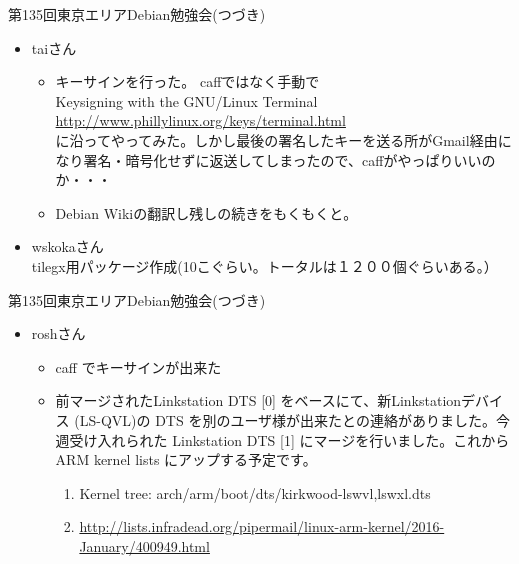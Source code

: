 \begin{frame}{第135回東京エリアDebian勉強会(つづき)}

\begin{itemize}
\item taiさん\\
  \begin{itemize}
  \item キーサインを行った。 caffではなく手動で\\
    Keysigning with the GNU/Linux Terminal\\
    \url{http://www.phillylinux.org/keys/terminal.html}\\
    に沿ってやってみた。しかし最後の署名したキーを送る所がGmail経由になり署名・暗号化せずに返送してしまったので、caffがやっぱりいいのか・・・
  \item Debian Wikiの翻訳し残しの続きをもくもくと。
  \end{itemize}
\item wskokaさん\\
  tilegx用パッケージ作成(10こぐらい。トータルは１２００個ぐらいある。）
\end{itemize}
\end{frame}

\begin{frame}{第135回東京エリアDebian勉強会(つづき)}

\begin{itemize}
\item roshさん\\
  \begin{itemize}
  \item caff でキーサインが出来た\\
  \item 前マージされたLinkstation DTS [0] をベースにて、新Linkstationデバイス (LS-QVL)の DTS を別のユーザ様が出来たとの連絡がありました。今週受け入れられた Linkstation DTS [1] にマージを行いました。これから ARM kernel lists にアップする予定です。\\
    \begin{enumerate}
    \item Kernel tree: arch/arm/boot/dts/kirkwood-{lswvl,lswxl}.dts
    \item \url{http://lists.infradead.org/pipermail/linux-arm-kernel/2016-January/400949.html}
    \end{enumerate}
  \end{itemize}
\end{itemize}
\end{frame}

